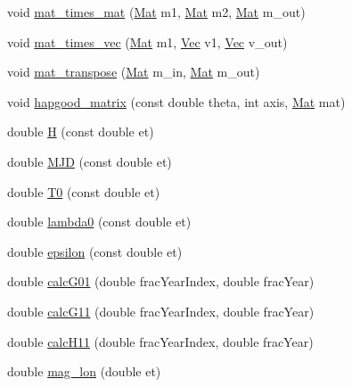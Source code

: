 \begin{DoxyCompactItemize}
\item 
void \hyperlink{cxform-manual_8c_a1f4ce7c90920f310bb7543dd01ce4f98}{mat\-\_\-times\-\_\-mat} (\hyperlink{cxform_8h_a89c340f4673cd75af597763b492a8fa1}{Mat} m1, \hyperlink{cxform_8h_a89c340f4673cd75af597763b492a8fa1}{Mat} m2, \hyperlink{cxform_8h_a89c340f4673cd75af597763b492a8fa1}{Mat} m\-\_\-out)
\item 
void \hyperlink{cxform-manual_8c_a54a60b4e36dd4c95a7c129884bac2d9c}{mat\-\_\-times\-\_\-vec} (\hyperlink{cxform_8h_a89c340f4673cd75af597763b492a8fa1}{Mat} m1, \hyperlink{cxform_8h_ae351b761259db318a538251033f3cb27}{Vec} v1, \hyperlink{cxform_8h_ae351b761259db318a538251033f3cb27}{Vec} v\-\_\-out)
\item 
void \hyperlink{cxform-manual_8c_a77c8e33324183648e2a9e4f77a422242}{mat\-\_\-transpose} (\hyperlink{cxform_8h_a89c340f4673cd75af597763b492a8fa1}{Mat} m\-\_\-in, \hyperlink{cxform_8h_a89c340f4673cd75af597763b492a8fa1}{Mat} m\-\_\-out)
\item 
void \hyperlink{cxform-manual_8c_a90a202672c17d19497833c2589286cd8}{hapgood\-\_\-matrix} (const double theta, int axis, \hyperlink{cxform_8h_a89c340f4673cd75af597763b492a8fa1}{Mat} mat)
\item 
double \hyperlink{cxform-manual_8c_ab97ee97a7a20980cfa40d7c28c30f847}{H} (const double et)
\item 
double \hyperlink{cxform-manual_8c_a972516f5baf3efcb440379386ebe7d16}{M\-J\-D} (const double et)
\item 
double \hyperlink{cxform-manual_8c_ae23b51b4b534071c5a477dd97ce39186}{T0} (const double et)
\item 
double \hyperlink{cxform-manual_8c_a995057a97d4e066b28f7c6335a58006d}{lambda0} (const double et)
\item 
double \hyperlink{cxform-manual_8c_a437aa2f848d339070f878e0deecd5dbf}{epsilon} (const double et)
\item 
double \hyperlink{cxform-manual_8c_ab95751a5e6ceadc3cab497212741477f}{calc\-G01} (double frac\-Year\-Index, double frac\-Year)
\item 
double \hyperlink{cxform-manual_8c_a77f0e08722c1a87fd774bb9425a7f7b9}{calc\-G11} (double frac\-Year\-Index, double frac\-Year)
\item 
double \hyperlink{cxform-manual_8c_a42194228f3217123ff26c5a3b53ad89f}{calc\-H11} (double frac\-Year\-Index, double frac\-Year)
\item 
double \hyperlink{cxform-manual_8c_ab66b822e2469cf8046effefcf1851cd5}{mag\-\_\-lon} (double et)

\end{DoxyCompactItemize}
